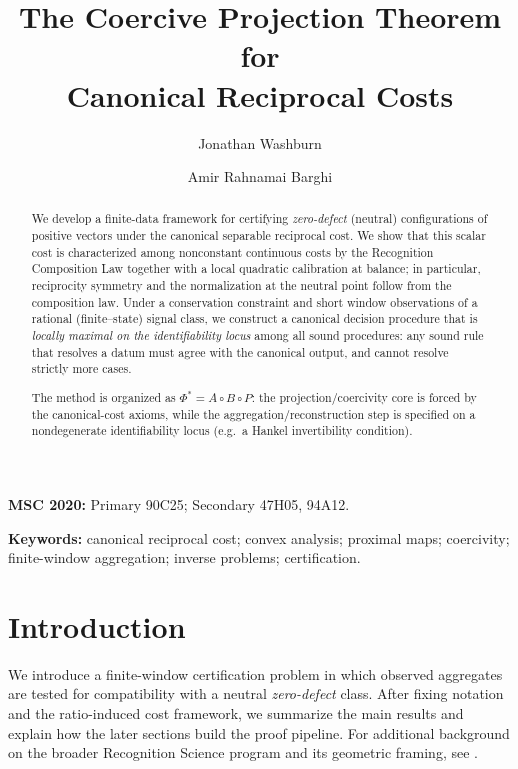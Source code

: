 \documentclass[11pt,reqno]{amsart}
\title[Coercive Projection Theorem]{The Coercive Projection Theorem for\\
Canonical Reciprocal Costs}
\author{Jonathan Washburn}
\author{Amir Rahnamai Barghi}
\date{} %
\theoremstyle{definition}
\theoremstyle{remark}
\newcommand{\1}{\mathbf{1}}
\begin{document}
\begin{abstract}
We develop a finite-data framework for certifying \emph{zero-defect} (neutral) configurations of positive vectors under the canonical separable reciprocal cost.
We show that this scalar cost is characterized among nonconstant continuous costs by the Recognition Composition Law together with a local quadratic calibration at balance; in particular, reciprocity symmetry and the normalization at the neutral point follow from the composition law.
Under a conservation constraint and short window observations of a rational (finite--state) signal class, we construct a canonical decision procedure that is \emph{locally maximal on the identifiability locus} among all sound procedures: any sound rule that resolves a datum must agree with the canonical output, and cannot resolve strictly more cases.

The method is organized as $\Phi^\ast=A\circ B\circ P$: the projection/coercivity core is forced by the canonical-cost axioms, while the aggregation/reconstruction step is specified on a nondegenerate identifiability locus (e.g.\ a Hankel invertibility condition).

\end{abstract}
\maketitle
\par\medskip
\noindent\textbf{MSC 2020:} Primary 90C25; Secondary 47H05, 94A12.\par
\noindent\textbf{Keywords:} canonical reciprocal cost; convex analysis; proximal maps; coercivity; finite-window aggregation; inverse problems; certification.\par
\medskip

\section{Introduction}

We introduce a finite-window certification problem in which observed aggregates are tested for compatibility with a neutral \emph{zero-defect} class. After fixing notation and the ratio-induced cost framework, we summarize the main results and explain how the later sections build the proof pipeline. For additional background on the broader Recognition Science program and its geometric framing, see \cite{washburnnetal2026RG}.
\end{document}
